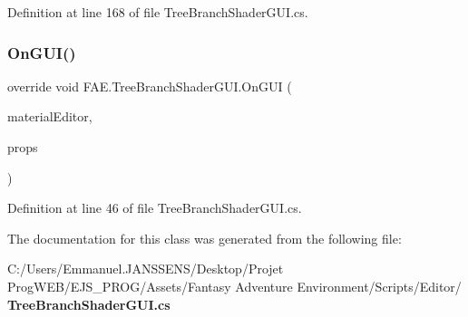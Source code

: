 Definition at line 168 of file Tree\+Branch\+Shader\+G\+U\+I.\+cs.

\mbox{\label{class_f_a_e_1_1_tree_branch_shader_g_u_i_a29d822a1fa748ca076fb409fe97be181}} 
\subsubsection{On\+G\+U\+I()}
{\footnotesize\ttfamily override void F\+A\+E.\+Tree\+Branch\+Shader\+G\+U\+I.\+On\+G\+UI (\begin{DoxyParamCaption}\item[{Material\+Editor}]{material\+Editor,  }\item[{Material\+Property [$\,$]}]{props }\end{DoxyParamCaption})}



Definition at line 46 of file Tree\+Branch\+Shader\+G\+U\+I.\+cs.



The documentation for this class was generated from the following file\+:\begin{DoxyCompactItemize}
\item 
C\+:/\+Users/\+Emmanuel.\+J\+A\+N\+S\+S\+E\+N\+S/\+Desktop/\+Projet Prog\+W\+E\+B/\+E\+J\+S\+\_\+\+P\+R\+O\+G/\+Assets/\+Fantasy Adventure Environment/\+Scripts/\+Editor/\textbf{ Tree\+Branch\+Shader\+G\+U\+I.\+cs}\end{DoxyCompactItemize}
